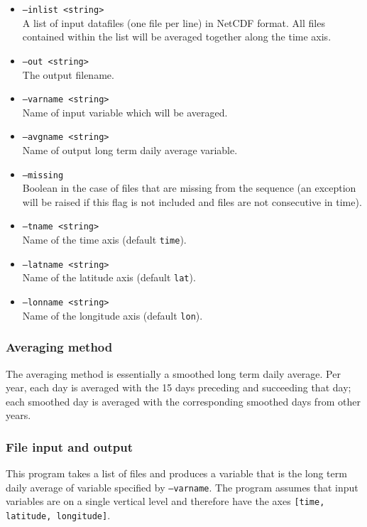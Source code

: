 \documentclass{article}
\begin{document}
\begin{itemize}
\item[]\texttt{--inlist <string>} \\ A list of input datafiles (one file per line) in NetCDF format. All files contained within the list will be averaged together along the time axis.
\item[] \texttt{--out <string>}\\ The output filename.
\item[] \texttt{--varname <string>}\\ Name of input variable which will be averaged.
\item[]\texttt{--avgname <string>}\\Name of output long term daily average variable.
\item[]\texttt{--missing}\\ Boolean in the case of files that are missing from the sequence (an exception will be raised if this flag is not included and files are not consecutive in time).
\item[] \texttt{--tname <string>}\\Name of the time axis (default \texttt{time}).
\item[]\texttt{--latname <string>}\\Name of the latitude axis (default \texttt{lat}).
\item[]\texttt{--lonname <string>}\\Name of the longitude axis (default \texttt{lon}).
\end{itemize}

\subsubsection{Averaging method}
The averaging method is essentially a smoothed long term daily average. Per year, each day is averaged with the 15 days preceding and succeeding that day; each smoothed day is averaged with the corresponding smoothed days from other years. 

\subsubsection{File input and output}
This program takes a list of files and produces a variable that is the long term daily average of variable specified by \texttt{--varname}. The program assumes that input variables are on a single vertical level and therefore have the axes \texttt{[time, latitude, longitude]}. 
\end{document}

